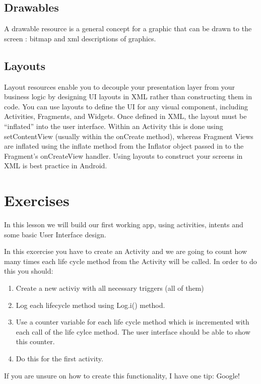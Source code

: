 \subsection{Drawables}
A drawable resource is a general concept for a graphic that can be drawn to the screen : bitmap and xml descriptions of graphics.
\subsection{Layouts}
Layout resources enable you to decouple your presentation layer from your business logic by designing UI layouts in XML rather than constructing them in code. You can use layouts to define the UI for any visual component, including Activities, Fragments, and Widgets. Once defined in XML, the layout must be “inflated” into the user interface. Within an Activity this is done using setContentView (usually within the onCreate method), whereas Fragment Views are inflated using the inflate method from the Inflator object passed in to the Fragment’s onCreateView handler. Using layouts to construct your screens in XML is best practice in Android.

\newpage
\section{Exercises}
In this lesson we will build our first working app, using activities, intents and some basic User Interface design.

\begin{exercise}
	In this excercise you have to create an Activity and we are going to count how many times each life cycle method from the Activity will be called. In order to do this you should:
	\begin{enumerate}
		\item Create a new activiy with all necessary triggers (all of them)
		\item Log each lifecycle method using Log.i() method.
		\item Use a counter variable for each life cycle method which is incremented with each call of the life cylce method. The user interface should be able to show this counter.
		\item Do this for the first activity. 
	\end{enumerate}
\label{ex:act1}
\end{exercise}

If you are unsure on how to create this functionality, I have one tip: Google!

